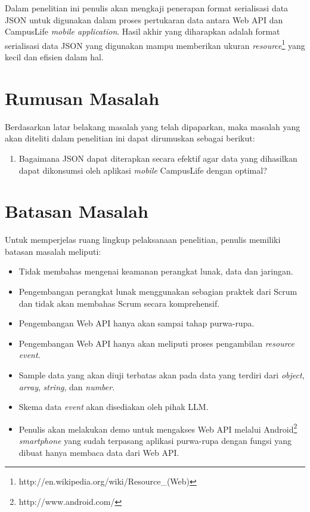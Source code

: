 \documentclass[a4paper, 12pt]{report}
\begin{document}
\onehalfspacing Dalam penelitian ini penulis akan mengkaji penerapan format serialisasi data JSON untuk digunakan dalam proses pertukaran data antara Web API dan CampusLife \textit{mobile application}. Hasil akhir yang diharapkan adalah format serialisasi data JSON yang digunakan mampu memberikan ukuran \textit{resource}\footnote{http://en.wikipedia.org/wiki/Resource\_(Web)} yang kecil dan efisien dalam hal.\cite{json-fat-free}

\section*{Rumusan Masalah}
\onehalfspacing Berdasarkan latar belakang masalah yang telah dipaparkan, maka masalah yang akan diteliti dalam penelitian ini dapat dirumuskan sebagai berikut:
\begin{enumerate}
  \item Bagaimana JSON dapat diterapkan secara efektif agar data yang dihasilkan dapat dikonsumsi oleh aplikasi \textit{mobile} CampusLife dengan optimal?
\end{enumerate}

\section*{Batasan Masalah}
\onehalfspacing Untuk memperjelas ruang lingkup pelaksanaan penelitian, penulis memiliki batasan masalah meliputi:
\onehalfspacing
\begin{itemize}
  \item Tidak membahas mengenai keamanan perangkat lunak, data dan jaringan.
  \item Pengembangan perangkat lunak menggunakan sebagian praktek dari Scrum dan tidak akan membahas Scrum secara komprehensif.
  \item Pengembangan Web API hanya akan sampai tahap purwa-rupa.
  \item Pengembangan Web API hanya akan meliputi proses pengambilan \textit{resource} \textit{event}.
  \item Sample data yang akan diuji terbatas akan pada data yang terdiri dari \textit{object}, \textit{array}, \textit{string}, dan \textit{number}.
  \item Skema data \textit{event} akan disediakan oleh pihak LLM.
  \item Penulis akan melakukan demo untuk mengakses Web API melalui Android\footnote{http://www.android.com/} \textit{smartphone} yang sudah terpasang aplikasi purwa-rupa dengan fungsi yang dibuat hanya membaca data dari Web API. %
\end{itemize}
\end{document}
